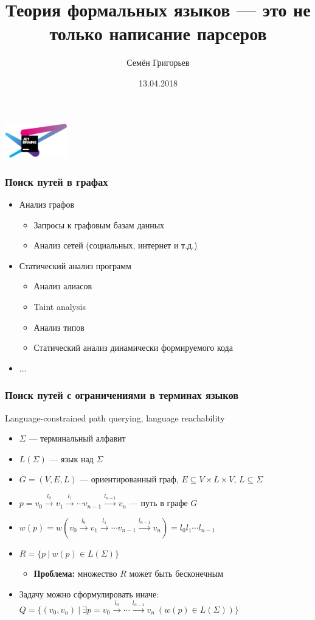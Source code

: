 \documentclass[xcolor=table,aspectratio=169]{beamer}
\title[CFPQ]{Теория формальных языков --- это не только написание парсеров}
\institute[JetBrains Research]{
JetBrains Research, лаборатория языковых инструментов
}
\author[Семён Григорьев]{Семён Григорьев}
\date{13.04.2018}
\begin{document}
{
\begin{frame}[fragile]
   \begin{center}
      \includegraphics[height=1.5cm]{pictures/JBLogo3.pdf}
    \end{center}
  \titlepage
\end{frame}
}

\begin{frame}[fragile]
  \transwipe[direction=90]
  \frametitle{Поиск путей в графах}
  \begin{itemize}
  \item Анализ графов
    \begin{itemize}
        \item Запросы к графовым базам данных
        \item Анализ сетей (социальных, интернет и т.д.)
    \end{itemize}
  \item Статический анализ программ
      \begin{itemize}
        \item Анализ алиасов
        \item Taint analysis
        \item Анализ типов
        \item Статический анализ динамически формируемого кода
      \end{itemize}
   \item ...
  \end{itemize}
\end{frame}

\begin{frame}[fragile]
  \transwipe[direction=90]
  \frametitle{Поиск путей с ограничениями в терминах языков}
  Language-constrained path querying, language reachability
  \begin{itemize}
  \item $\Sigma$ --- терминальный алфавит
  \item $L(\Sigma)$ --- язык над $\Sigma$
  \item $G = (V,E,L)$ --- ориентированный граф, $E \subseteq V\times L \times V$, $L\subseteq \Sigma$
  \item $p = v_0 \xrightarrow{l_0} v_1 \xrightarrow{l_1} \cdots v_{n-1}\xrightarrow{l_{n-1}}v_n$ --- путь в графе $G$
  \item $w(p) = w(v_0 \xrightarrow{l_0} v_1 \xrightarrow{l_1} \cdots v_{n-1}\xrightarrow{l_{n-1}}v_n) = l_0 l_1 \cdots l_{n-1}$
  \item $R =\{ p \ | \ w(p) \in L(\Sigma)\}$
  \begin{itemize}
    \item \textbf{Проблема:} множество $R$ может быть бесконечным
  \end{itemize}
  \item Задачу можно сформулировать иначе: $Q =\{ (v_0,v_n) \ | \ \exists p = v_0 \xrightarrow{l_0} \cdots \xrightarrow{l_{n-1}}v_n \ (w(p) \in 
  L(\Sigma))\}$
  \end{itemize}
\end{frame}
\end{document}
